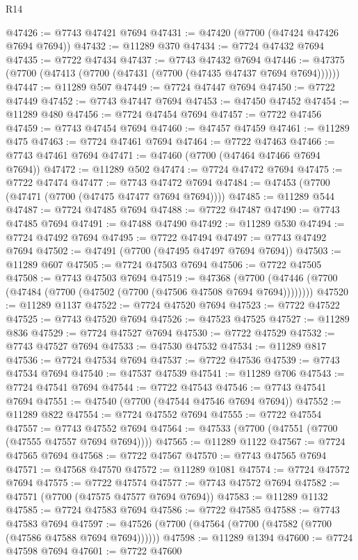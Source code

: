 \begin{lexlean}{R14}
\begin{coremodule}
@47426 := @7743 @47421 @7694
@47431 := @47420 (@7700 (@47424 @47426 @7694 @7694))
@47432 := @11289 @370
@47434 := @7724 @47432 @7694
@47435 := @7722 @47434
@47437 := @7743 @47432 @7694
@47446 := @47375 (@7700 (@47413 (@7700 (@47431 (@7700 (@47435 @47437 @7694 @7694))))))
@47447 := @11289 @507
@47449 := @7724 @47447 @7694
@47450 := @7722 @47449
@47452 := @7743 @47447 @7694
@47453 := @47450 @47452
@47454 := @11289 @480
@47456 := @7724 @47454 @7694
@47457 := @7722 @47456
@47459 := @7743 @47454 @7694
@47460 := @47457 @47459
@47461 := @11289 @475
@47463 := @7724 @47461 @7694
@47464 := @7722 @47463
@47466 := @7743 @47461 @7694
@47471 := @47460 (@7700 (@47464 @47466 @7694 @7694))
@47472 := @11289 @502
@47474 := @7724 @47472 @7694
@47475 := @7722 @47474
@47477 := @7743 @47472 @7694
@47484 := @47453 (@7700 (@47471 (@7700 (@47475 @47477 @7694 @7694))))
@47485 := @11289 @544
@47487 := @7724 @47485 @7694
@47488 := @7722 @47487
@47490 := @7743 @47485 @7694
@47491 := @47488 @47490
@47492 := @11289 @530
@47494 := @7724 @47492 @7694
@47495 := @7722 @47494
@47497 := @7743 @47492 @7694
@47502 := @47491 (@7700 (@47495 @47497 @7694 @7694))
@47503 := @11289 @607
@47505 := @7724 @47503 @7694
@47506 := @7722 @47505
@47508 := @7743 @47503 @7694
@47519 := @47368
    (@7700 (@47446 (@7700 (@47484 (@7700 (@47502 (@7700 (@47506 @47508 @7694 @7694))))))))
@47520 := @11289 @1137
@47522 := @7724 @47520 @7694
@47523 := @7722 @47522
@47525 := @7743 @47520 @7694
@47526 := @47523 @47525
@47527 := @11289 @836
@47529 := @7724 @47527 @7694
@47530 := @7722 @47529
@47532 := @7743 @47527 @7694
@47533 := @47530 @47532
@47534 := @11289 @817
@47536 := @7724 @47534 @7694
@47537 := @7722 @47536
@47539 := @7743 @47534 @7694
@47540 := @47537 @47539
@47541 := @11289 @706
@47543 := @7724 @47541 @7694
@47544 := @7722 @47543
@47546 := @7743 @47541 @7694
@47551 := @47540 (@7700 (@47544 @47546 @7694 @7694))
@47552 := @11289 @822
@47554 := @7724 @47552 @7694
@47555 := @7722 @47554
@47557 := @7743 @47552 @7694
@47564 := @47533 (@7700 (@47551 (@7700 (@47555 @47557 @7694 @7694))))
@47565 := @11289 @1122
@47567 := @7724 @47565 @7694
@47568 := @7722 @47567
@47570 := @7743 @47565 @7694
@47571 := @47568 @47570
@47572 := @11289 @1081
@47574 := @7724 @47572 @7694
@47575 := @7722 @47574
@47577 := @7743 @47572 @7694
@47582 := @47571 (@7700 (@47575 @47577 @7694 @7694))
@47583 := @11289 @1132
@47585 := @7724 @47583 @7694
@47586 := @7722 @47585
@47588 := @7743 @47583 @7694
@47597 := @47526 (@7700 (@47564 (@7700 (@47582 (@7700 (@47586 @47588 @7694 @7694))))))
@47598 := @11289 @1394
@47600 := @7724 @47598 @7694
@47601 := @7722 @47600

\end{coremodule}
\end{lexlean}
